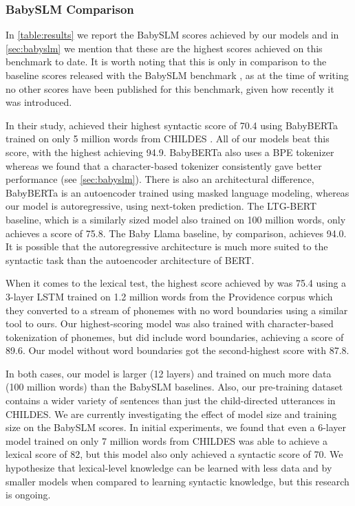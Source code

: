 \subsubsection{BabySLM Comparison}
\label{sec:babyslmcomparison}

In \cref{table:results} we report the BabySLM scores achieved by our models and in \cref{sec:babyslm} we mention that these are the highest scores achieved on this benchmark to date. It is worth noting that this is only in comparison to the baseline scores released with the BabySLM benchmark \citep{lavechin}, as at the time of writing no other scores have been published for this benchmark, given how recently it was introduced.

In their study, \citet{lavechin} achieved their highest syntactic score of 70.4 using BabyBERTa \citep{huebner-etal-2021-babyberta} trained on only 5 million words from CHILDES \citep{macwhinney1985child}. All of our models beat this score, with the highest achieving 94.9. BabyBERTa also uses a BPE tokenizer whereas we found that a character-based tokenizer consistently gave better performance (see \cref{sec:babyslm}). There is also an architectural difference, BabyBERTa is an autoencoder trained using masked language modeling, whereas our model is autoregressive, using next-token prediction. The LTG-BERT baseline, which is a similarly sized model also trained on 100 million words, only achieves a score of 75.8. The Baby Llama baseline, by comparison, achieves 94.0. It is possible that the autoregressive architecture is much more suited to the syntactic task than the autoencoder architecture of BERT. 

When it comes to the lexical test, the highest score achieved by \citet{lavechin} was 75.4 using a 3-layer LSTM trained on 1.2 million words from the Providence corpus \citep{borschinger-etal-2013-joint} which they converted to a stream of phonemes with no word boundaries using a similar tool to ours. Our highest-scoring model was also trained with character-based tokenization of phonemes, but did include word boundaries, achieving a score of 89.6. Our model without word boundaries got the second-highest score with 87.8.

In both cases, our model is larger (12 layers) and trained on much more data (100 million words) than the BabySLM baselines. Also, our pre-training dataset contains a wider variety of sentences than just the child-directed utterances in CHILDES. We are currently investigating the effect of model size and training size on the BabySLM scores. In initial experiments, we found that even a 6-layer model trained on only 7 million words from CHILDES was able to achieve a lexical score of 82, but this model also only achieved a syntactic score of 70. We hypothesize that lexical-level knowledge can be learned with less data and by smaller models when compared to learning syntactic knowledge, but this research is ongoing.

